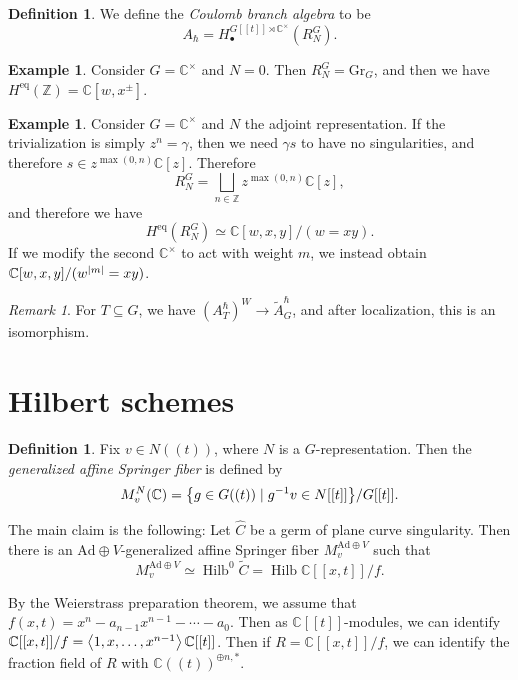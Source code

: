 \documentclass[leqno, openany]{memoir}
\theoremstyle{definition}
\newtheorem{defn}[thm]{Definition}
\newtheorem{exm}[thm]{Example}
\theoremstyle{remark}
\newtheorem{rmk}[thm]{Remark}
\theoremstyle{plain}
\theoremstyle{definition}
\theoremstyle{remark}
\newcommand{\C}{\mathbb{C}}
\newcommand{\Z}{\mathbb{Z}}
\newcommand{\mr}[1]{\mathrm{#1}}
\newcommand{\on}[1]{\operatorname{#1}}
\newcommand{\wt}[1]{\widetilde{#1}}
\newcommand{\wh}[1]{\widehat{#1}}
\newcommand{\1}{\mathbf{1}}
\newcommand{\2}{\mathbf{2}}
\newcommand{\3}{\mathbf{3}}
\begin{document}
\begin{defn}
    We define the \textit{Coulomb branch algebra} to be
    \[ A_{\hbar} = H_{\bullet}^{G[[t]] \rtimes \C^{\times}}(R_N^G). \]
\end{defn}

\begin{exm}
    Consider $G = \C^{\times}$ and $N = 0$. Then $R_N^G = \mr{Gr}_G$, and then we have $H^{\mr{eq}}(\Z) = \C[w, x^{\pm}]$.
\end{exm}

\begin{exm}
    Consider $G = \C^{\times}$ and $N$ the adjoint representation. If the trivialization is simply $z^n = \gamma$, then we need $\gamma s$ to have no singularities, and therefore $s \in z^{\max(0, n)} \C[z]$. Therefore 
    \[ R_N^G = \bigsqcup_{n \in \Z} z^{\max(0, n)} \C[z], \]
    and therefore we have
    \[ H^{\mr{eq}}(R_N^G) \simeq \C[w,x,y] / (w=xy). \]
    If we modify the second $\C^{\times}$ to act with weight $m$, we instead obtain $\C[w,x,y] / (w^{\abs{m}} = xy)$.
\end{exm}

\begin{rmk}
    For $T \subseteq G$, we have $(A_T^{\hbar})^W \to \wt{A}_G^{\hbar}$, and after localization, this is an isomorphism.
\end{rmk}

\section{Hilbert schemes}%
\label{sec:hilbert_schemes}

\begin{defn}
    Fix $v \in N((t))$, where $N$ is a $G$-representation. Then the \textit{generalized affine Springer fiber} is defined by
    \[ M_v^N(\C) = \qty{g \in G((t)) \mid g^{-1} v \in N[[t]]} / G[[t]]. \]
\end{defn}

The main claim is the following: Let $\wh{C}$ be a germ of plane curve singularity. Then there is an $\mr{Ad} \oplus V$-generalized affine Springer fiber $M_v^{\mr{Ad} \oplus V}$ such that
\[ M_v^{\mr{Ad} \oplus V} \simeq \on{Hilb}^0 \wt{C} = \on{Hilb} \C[[x,t]]/f. \]

By the Weierstrass preparation theorem, we assume that $f(x,t) = x^n - a_{n-1} x^{n-1} - \cdots - a_0$. Then as $\C[[t]]$-modules, we can identify $\C[[x,t]]/f = \ev{1, x, \ldots, x^{n-1}} \C[[t]]$. Then if $R = \C[[x,t]]/f$, we can identify the fraction field of $R$ with $\C((t))^{\oplus n, *}$.
\end{document}
